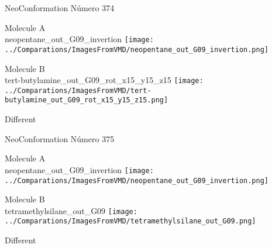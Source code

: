  \newpage

\vtab[-2cm]
\begin{center}
{\large NeoConformation \tab Número 374}
\end{center}
\begin{multicols}{2}
\begin{center}
Molecule A \\ 
neopentane\_out\_G09\_invertion
\texttt{[image: ../Comparations/ImagesFromVMD/neopentane\_out\_G09\_invertion.png]}
\\
\vtab

\columnbreak
Molecule B \\ 
tert-butylamine\_out\_G09\_rot\_x15\_y15\_z15
\texttt{[image: ../Comparations/ImagesFromVMD/tert-butylamine\_out\_G09\_rot\_x15\_y15\_z15.png]}
\\
\vtab


\end{center}
\end{multicols}
\begin{center}
\vtab
\vtab
\textcolor{NavyBlue}{\Large Different}
\end{center}

 \newpage

\vtab[-2cm]
\begin{center}
{\large NeoConformation \tab Número 375}
\end{center}
\begin{multicols}{2}
\begin{center}
Molecule A \\ 
neopentane\_out\_G09\_invertion
\texttt{[image: ../Comparations/ImagesFromVMD/neopentane\_out\_G09\_invertion.png]}
\\
\vtab

\columnbreak
Molecule B \\ 
tetramethylsilane\_out\_G09
\texttt{[image: ../Comparations/ImagesFromVMD/tetramethylsilane\_out\_G09.png]}
\\
\vtab


\end{center}
\end{multicols}
\begin{center}
\vtab
\vtab
\textcolor{NavyBlue}{\Large Different}
\end{center}

 \newpage

